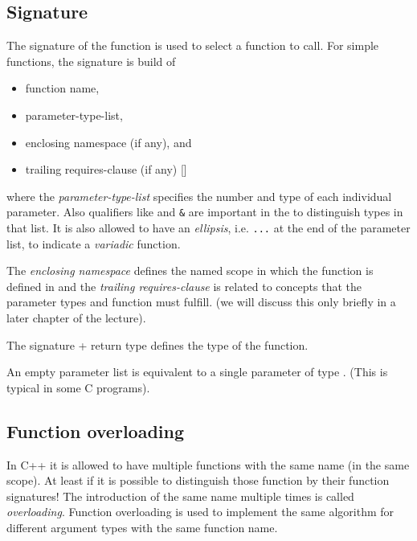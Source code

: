 \subsection{Signature\label{sec:function-signature}}
The signature of the function is used to select a function to call. For simple functions, the signature is build of
\begin{itemize}
  \item function name,
  \item parameter-type-list,
  \item enclosing namespace (if any), and
  \item trailing requires-clause (if any) []
\end{itemize}
where the \emph{parameter-type-list} specifies the number and type of each individual parameter. Also qualifiers like  and \texttt{\&}
are important in the to distinguish types in that list. It is also allowed to have an \emph{ellipsis}, i.e. \texttt{...} at the end of the parameter
list, to indicate a \emph{variadic} function.

The \emph{enclosing namespace} defines the named scope in which the function is defined in and the \emph{trailing requires-clause} is related
to concepts that the parameter types and function must fulfill. (we will discuss this only briefly in a later chapter of the lecture).

The signature + return type defines the type of the function.

\begin{rem}
  An empty parameter list is equivalent to a single parameter of type . (This is typical in some C programs).
\end{rem}

\subsection{Function overloading\label{sec:function-overloading}}
In C++ it is allowed to have multiple functions with the same name (in the same scope). At least if it is possible to distinguish those function by
their function signatures! The introduction of the same name multiple times is called \emph{overloading}. Function overloading is used to implement
the same algorithm for different argument types with the same function name.


